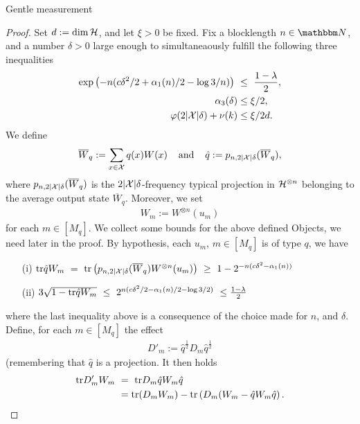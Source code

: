 \begin{subsubsection}{Gentle measurement}
	\begin{proof}
	 Set $d := \dim {\mathcal H}$, and let $\xi > 0$ be fixed. Fix a blocklength $n \in \bbmN$, and a number $\delta > 0$ large enough to simultaneaously fulfill the following three inequalities
	 \begin{align}
	  \exp\left(-n(c \delta^2/2 + \alpha_1(n)/2 - \log3 /n) \right) \  
	  & \leq \ \frac{1-\lambda}{2}, \\ 
	  \alpha_3(\delta) &\leq \xi/2, \\
	  \varphi(2 |{\mathcal X}| \delta) + \nu(k) &\leq \xi/2d.
	 \end{align}
         We define 
         \begin{align}
          \overline{W}_q := \sum_{x \in {\mathcal X}} q(x) W(x) \hspace{.4cm} \text{and} \hspace{.4cm} \hat{q} := p_{n,2|{\mathcal X}|\delta}(\overline{W}_q),
         \end{align}
         where $p_{n,2|{\mathcal X}|\delta}(\overline{W}_q)$ is the $2|{\mathcal X}|\delta$-frequency typical projection in ${\mathcal H}^{\otimes n}$ belonging to the average output state $\overline{W}_q$. Moreover, we set
         \begin{align}
          W_m := W^{\otimes n}(u_m)
         \end{align}
         for each $m \in [M_q]$. We collect some bounds for the above defined Objects, we need later in the proof. By hypothesis, each $u_m$, $m \in [M_q]$ is of type $q$, we have 
         \begin{enumerate}
          \item[(i)] $\mathrm{tr} \hat{q} W_m \ = \ \mathrm{tr}\left(p_{n,2|{\mathcal X}|\delta}(\overline{W}_q)W^{\otimes n}(u_m)\right) \ \geq \ 1 - 2^{-n(c \delta^2 - \alpha_1(n))}$
          \item[(ii)] $3 \sqrt{1 - \mathrm{tr} \hat{q}W_m} \ \leq \  2^{n(c\delta^2/2 - \alpha_1(n)/2 - \log3/2)}\ \leq \frac{1-\lambda}{2}$
         \end{enumerate}
         where the last inequality above is a consequence of the choice made for $n$, and $\delta$. Define, for each $m \in [M_q]$ the effect 
         \begin{align}
          D'_m := \hat{q}^{\tfrac{1}{2}} D_m \hat{q}^{\tfrac{1}{2}}
         \end{align}
	 (remembering that $\hat{q}$ is a projection. It then holds 
	 \begin{align}
	  \tr D'_m W_m \ 
	  & = \ \tr D_m \hat{q} W_m \hat{q}  \\
	  & = \tr(D_m W_m) - \tr\left(D_m(W_m - \hat{q} W_m \hat{q}\right). \label{strong_converse_pre_proposition_1}

\end{align}
\end{proof}
\end{subsubsection}
